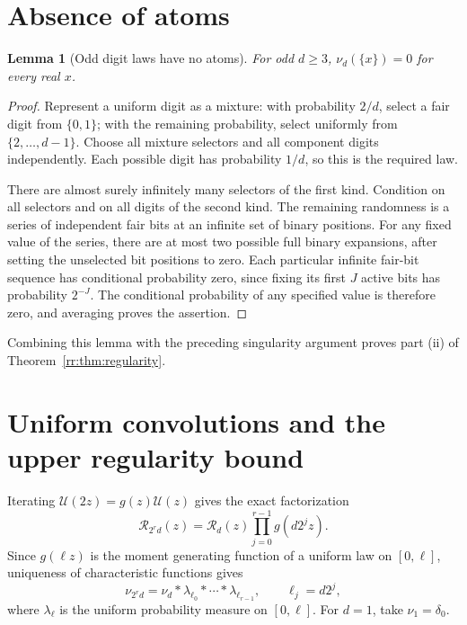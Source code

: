 \documentclass[11pt,a4paper,oneside,openany]{book}
\numberwithin{equation}{chapter}
\newtheorem{lemma}[theorem]{Lemma}
\theoremstyle{definition}
\theoremstyle{remark}
\newcommand{\Up}{\mathcal U}
\newcommand{\Rp}{\mathcal R}
\begin{document}
\section{Absence of atoms}
\begin{lemma}[Odd digit laws have no atoms]
For odd \(d\geq3\), \(\nu_d(\{x\})=0\) for every real \(x\).
\end{lemma}
\begin{proof}
Represent a uniform digit as a mixture: with probability \(2/d\), select a fair digit from \(\{0,1\}\); with the remaining probability, select uniformly from \(\{2,\ldots,d-1\}\). Choose all mixture selectors and all component digits independently. Each possible digit has probability \(1/d\), so this is the required law.

There are almost surely infinitely many selectors of the first kind. Condition on all selectors and on all digits of the second kind. The remaining randomness is a series of independent fair bits at an infinite set of binary positions. For any fixed value of the series, there are at most two possible full binary expansions, after setting the unselected bit positions to zero. Each particular infinite fair-bit sequence has conditional probability zero, since fixing its first \(J\) active bits has probability \(2^{-J}\). The conditional probability of any specified value is therefore zero, and averaging proves the assertion.
\end{proof}
Combining this lemma with the preceding singularity argument proves part (ii) of Theorem~\ref{rr:thm:regularity}.

\section{Uniform convolutions and the upper regularity bound}
Iterating \(\Up(2z)=g(z)\Up(z)\) gives the exact factorization
\begin{equation}
 \Rp_{2^rd}(z)=\Rp_d(z)\prod_{j=0}^{r-1}g(d2^jz).
 \label{rr:eq:smoothingfactor}
\end{equation}
Since \(g(\ell z)\) is the moment generating function of a uniform law on \([0,\ell]\), uniqueness of characteristic functions gives
\begin{equation}
 \nu_{2^rd}=\nu_d*\lambda_{\ell_0}*\cdots*\lambda_{\ell_{r-1}},
 \qquad \ell_j=d2^j,
 \label{rr:eq:convolutionlaw}
\end{equation}
where \(\lambda_\ell\) is the uniform probability measure on \([0,\ell]\). For \(d=1\), take \(\nu_1=\delta_0\).
\end{document}
